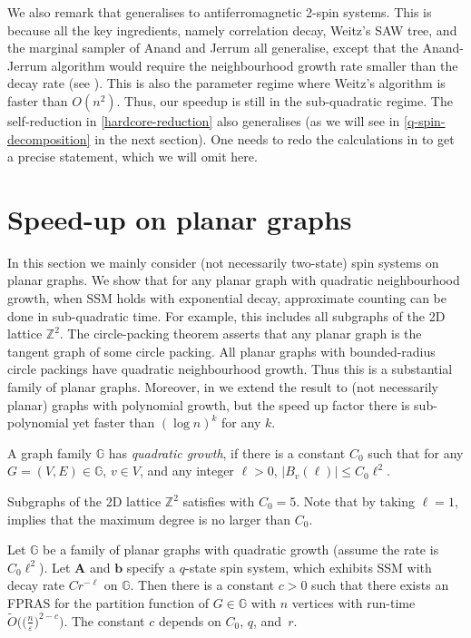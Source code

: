 \documentclass{theoretics}
\def\=#1{\mathbb{#1}}
\newcommand{\abs}[1]{\ensuremath{\left\vert#1\right\vert}}
\newcommand{\eps}{\varepsilon}
\begin{document}
We also remark that  generalises to antiferromagnetic 2-spin systems.
This is because all the key ingredients, namely correlation decay, Weitz's SAW tree, and the marginal sampler of Anand and Jerrum all generalise,
except that the Anand-Jerrum algorithm would require the neighbourhood growth rate smaller than the decay rate (see ).
This is also the parameter regime where Weitz's algorithm is faster than $O(n^2)$.
Thus, our speedup is still in the sub-quadratic regime.
The self-reduction in \eqref{hardcore-reduction} also generalises (as we will see in \eqref{q-spin-decomposition} in the next section).
One needs to redo the calculations in  to get a precise statement, which we will omit here.

\section{Speed-up on planar graphs}
In this section we mainly consider (not necessarily two-state) spin systems on planar graphs.
We show that for any planar graph with quadratic neighbourhood growth,
when SSM holds with exponential decay,
approximate counting can be done in sub-quadratic time.
For example, this includes all subgraphs of the 2D lattice $\=Z^2$.
The circle-packing theorem asserts that any planar graph is the tangent graph of some circle packing.
All planar graphs with bounded-radius circle packings have quadratic neighbourhood growth.
Thus this is a substantial family of planar graphs.
Moreover, in  we extend the result to (not necessarily planar) graphs with polynomial growth,
but the speed up factor there is sub-polynomial yet faster than $(\log n)^k$ for any $k$.

\begin{definition}  \label{def:quadratic-growth}
  A graph family $\=G$ has \emph{quadratic growth},
  if there is a constant $C_0$ such that for any $G=(V,E)\in\=G$, $v\in V$, and any integer $\ell>0$,
  $\abs{B_v(\ell)}\le C_0\ell^2$.
\end{definition}

Subgraphs of the 2D lattice $\=Z^2$ satisfies  with $C_0=5$.
Note that by taking $\ell=1$,  implies that the maximum degree is no larger than $C_0$.

\begin{theorem}\label{lattice-counting}
  Let $\=G$ be a family of planar graphs with quadratic growth (assume the rate is $C_0\ell^2$).
  Let ${\mathbf{A}}$ and ${\mathbf{b}}$ specify a $q$-state spin system, which exhibits SSM with decay rate $Cr^{-\ell}$ on $\=G$.
  Then there is a constant $c>0$ such that there exists an FPRAS for the partition function of $G\in\=G$ with $n$ vertices with run-time $\widetilde{O}\big(\big(\frac{n}{\eps}\big)^{2-c}\big)$.
  The constant $c$ depends on $C_0$, $q$, and~$r$.
\end{theorem}
\end{document}
